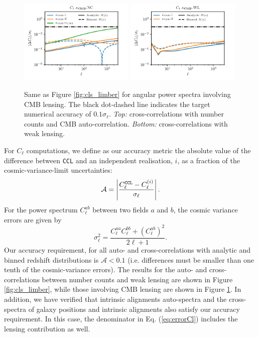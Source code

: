 \documentclass[\docopts]{\docclass}
\newcommand{\ccl}{{\tt CCL}\xspace}
\begin{document}
\begin{figure}
\includegraphics[width=0.49\textwidth]{Cl_dc}
\includegraphics[width=0.49\textwidth]{Cl_lc}
\caption{Same as Figure \ref{fig:cls_limber} for angular power spectra involving CMB lensing. The black dot-dashed line indicates the target numerical accuracy of $0.1\sigma_\ell$. {\sl Top:} cross-correlations with number counts and CMB auto-correlation. {\sl Bottom:} cross-correlations with weak lensing.}
\label{fig:cls_cmblens}
\end{figure}

For $C_\ell$ computations, we define as our accuracy metric the absolute value of the difference between \ccl and an independent realisation, $i$, as a fraction of the cosmic-variance-limit uncertainties:
\begin{equation}
  \mathcal{A}=\left|\frac{C_\ell^{\tt CCL}-C_\ell^{(i)}}{\sigma_\ell}\right|.
  \label{eq:errorCl}
\end{equation}
For the power spectrum $C^{ab}_\ell$ between two fields $a$ and $b$, the cosmic variance errors are given by
\begin{equation}
  \sigma_\ell^2=\frac{C^{aa}_\ell C^{bb}_\ell+(C^{ab}_\ell)^2}{2\ell+1}.
  \label{eq:sigmaell}
\end{equation}
Our accuracy requirement, for all auto- and cross-correlations with analytic and binned redshift distributions is $\mathcal{A}<0.1$ (i.e. differences must be smaller than one tenth of the cosmic-variance errors). The results for the auto- and cross-correlations between number counts and weak lensing are shown in Figure \ref{fig:cls_limber}, while those involving CMB lensing are shown in Figure \ref{fig:cls_cmblens}. In addition, we have verified that intrinsic alignments auto-spectra and the cross-spectra of galaxy positions and intrinsic alignments also satisfy our accuracy requirement. In this case, the denominator in Eq. (\ref{eq:errorCl}) includes the lensing contribution as well.
\end{document}
